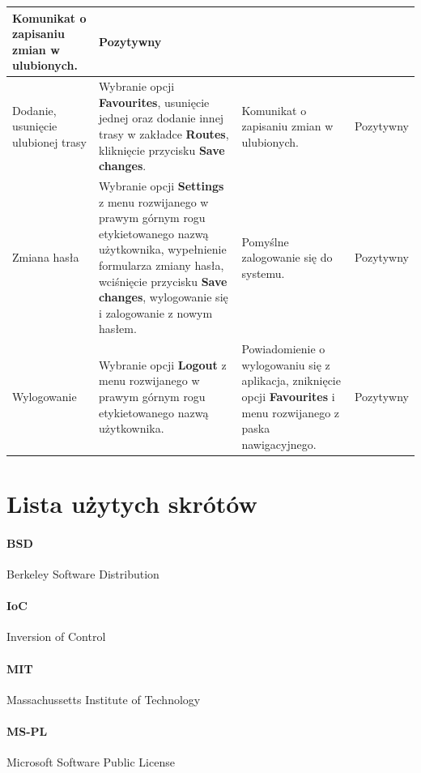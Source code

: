 \documentclass[10pt,a4paper]{article}
\begin{document}
\begin{tabularx}{\textwidth}{|X|X|X|l|}
	Komunikat o zapisaniu zmian w ulubionych. &
	Pozytywny \\
	\hline
	Dodanie, usunięcie ulubionej trasy &
	Wybranie opcji \textbf{Favourites}, usunięcie jednej oraz dodanie innej trasy w zakładce \textbf{Routes}, kliknięcie przycisku \textbf{Save changes}. &
	Komunikat o zapisaniu zmian w ulubionych. &
	Pozytywny \\
	\hline
	Zmiana hasła &
	Wybranie opcji \textbf{Settings} z menu rozwijanego w prawym górnym rogu etykietowanego nazwą użytkownika, wypełnienie formularza zmiany hasła, wciśnięcie przycisku \textbf{Save changes}, wylogowanie się i zalogowanie z nowym hasłem. &
	Pomyślne zalogowanie się do systemu. &
	Pozytywny \\
	\hline
	Wylogowanie &
	Wybranie opcji \textbf{Logout}  z menu rozwijanego w prawym górnym rogu etykietowanego nazwą użytkownika. &
	Powiadomienie o wylogowaniu się z aplikacja, zniknięcie opcji \textbf{Favourites} i menu rozwijanego z paska nawigacyjnego. &
	Pozytywny \\
	\hline
\end{tabularx}

\newpage
\section{Lista użytych skrótów}
\label{abbr:bsd}
\paragraph{BSD} Berkeley Software Distribution

\label{abbr:ioc}
\paragraph{IoC} Inversion of Control

\label{abbr:mit}
\paragraph{MIT} Massachussetts Institute of Technology  

\label{abbr:mspl}
\paragraph{MS-PL} Microsoft Software Public License
\end{document}
